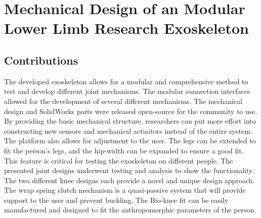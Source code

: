 
\chapter{Mechanical Design of an Modular Lower Limb Research Exoskeleton}
\label{chap:mech}










\section{Contributions}

The developed exoskeleton allows for a modular and comprehensive method to test and develop different joint mechanisms. The modular connection interfaces allowed for the development of several different mechanisms. The mechanical design and SolidWorks parts were released open-source for the community to use. By providing the basic mechanical structure, researchers can put more effort into constructing new sensors and mechanical actuators instead of the entire system. The platform also allows for adjustment to the user. The legs can be extended to fit the person's legs, and the hip-width can be expanded to ensure a good fit. This feature is critical for testing the exoskeleton on different people. The presented joint designs underwent testing and analysis to show the functionality. The two different knee designs each provide a novel and unique design approach. The wrap spring clutch mechanism is a quasi-passive system that will provide support to the user and prevent buckling. The Bio-knee fit can be easily manufactured and designed to fit the anthropomorphic parameters of the person.


